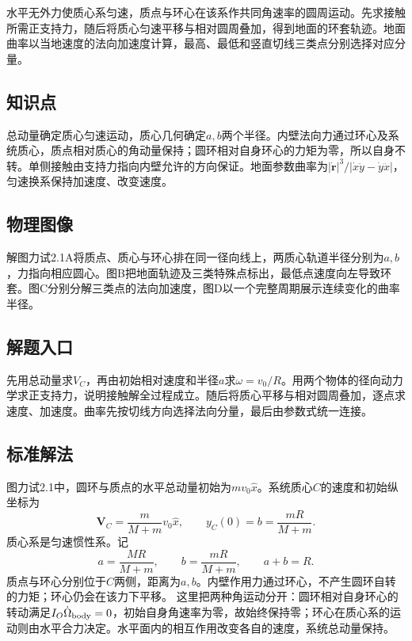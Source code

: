 \documentclass[UTF8,fontset=fandol,a4paper,11pt]{ctexart}
\begin{document}
水平无外力使质心系匀速，质点与环心在该系作共同角速率的圆周运动。先求接触所需正支持力，随后将质心匀速平移与相对圆周叠加，得到地面的环套轨迹。地面曲率以当地速度的法向加速度计算，最高、最低和竖直切线三类点分别选择对应分量。



\subsection*{知识点}

总动量确定质心匀速运动，质心几何确定$a,b$两个半径。内壁法向力通过环心及系统质心，质点相对质心的角动量保持；圆环相对自身环心的力矩为零，所以自身不转。单侧接触由支持力指向内壁允许的方向保证。地面参数曲率为$|\dot{\boldsymbol r}|^3/|\dot x\ddot y-\dot y\ddot x|$，匀速换系保持加速度、改变速度。



\subsection*{物理图像}

解图力试2.1A将质点、质心与环心排在同一径向线上，两质心轨道半径分别为$a,b$，力指向相应圆心。图B把地面轨迹及三类特殊点标出，最低点速度向左导致环套。图C分别分解三类点的法向加速度，图D以一个完整周期展示连续变化的曲率半径。



\subsection*{解题入口}

先用总动量求$V_C$，再由初始相对速度和半径$a$求$\omega=v_0/R$。用两个物体的径向动力学求正支持力，说明接触解全过程成立。随后将质心平移与相对圆周叠加，逐点求速度、加速度。曲率先按切线方向选择法向分量，最后由参数式统一连接。



\subsection*{标准解法}


图力试2.1中，圆环与质点的水平总动量初始为$mv_0\hat x$。系统质心$C$的速度和初始纵坐标为
\[
\boldsymbol V_C=\frac{m}{M+m}v_0\hat x,\qquad
y_C(0)=b=\frac{mR}{M+m}.
\]
质心系是匀速惯性系。记
\[
a=\frac{MR}{M+m},\qquad b=\frac{mR}{M+m},\qquad a+b=R.
\]
质点与环心分别位于$C$两侧，距离为$a,b$。内壁作用力通过环心，不产生圆环自转的力矩；环心仍会在该力下平移。
这里把两种角运动分开：圆环相对自身环心的转动满足$I_O\dot\Omega_{\rm body}=0$，初始自身角速率为零，故始终保持零；环心在质心系的运动则由水平合力决定。水平面内的相互作用改变各自的速度，系统总动量保持。
\end{document}
